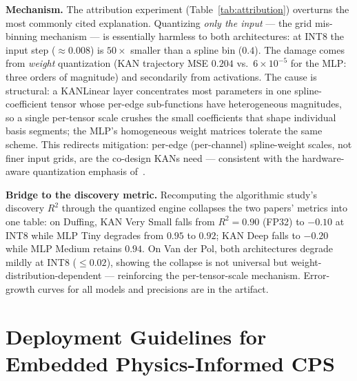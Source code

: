 \documentclass[conference]{IEEEtran}
\newcommand{\Rsq}{R^2}
\begin{document}
\textbf{Mechanism.} The attribution experiment (Table~\ref{tab:attribution})
overturns the most commonly cited explanation. Quantizing \emph{only the
input} --- the grid mis-binning mechanism --- is essentially harmless to both
architectures: at INT8 the input step ($\approx0.008$) is $50\times$ smaller
than a spline bin ($0.4$). The damage comes from \emph{weight} quantization
(KAN trajectory MSE $0.204$ vs.\ $6\times10^{-5}$ for the MLP: three orders of
magnitude) and secondarily from activations. The cause is structural: a
KANLinear layer concentrates most parameters in one spline-coefficient tensor
whose per-edge sub-functions have heterogeneous magnitudes, so a single
per-tensor scale crushes the small coefficients that shape individual basis
segments; the MLP's homogeneous weight matrices tolerate the same scheme.
This redirects mitigation: per-edge (per-channel) spline-weight scales, not
finer input grids, are the co-design KANs need --- consistent with the
hardware-aware quantization emphasis of~\cite{huang2025hardware}.

\textbf{Bridge to the discovery metric.} Recomputing the algorithmic study's
discovery $\Rsq$ through the quantized engine collapses the two papers'
metrics into one table: on Duffing, KAN Very Small falls from $\Rsq=0.90$
(FP32) to $-0.10$ at INT8 while MLP Tiny degrades from $0.95$ to $0.92$;
KAN Deep falls to $-0.20$ while MLP Medium retains $0.94$. On Van der Pol,
both architectures degrade mildly at INT8 ($\leq0.02$), showing the collapse
is not universal but weight-distribution-dependent --- reinforcing the
per-tensor-scale mechanism. Error-growth curves for all models and precisions
are in the artifact.

\section{Deployment Guidelines for Embedded Physics-Informed CPS}
\label{sec:guidelines}
\end{document}
